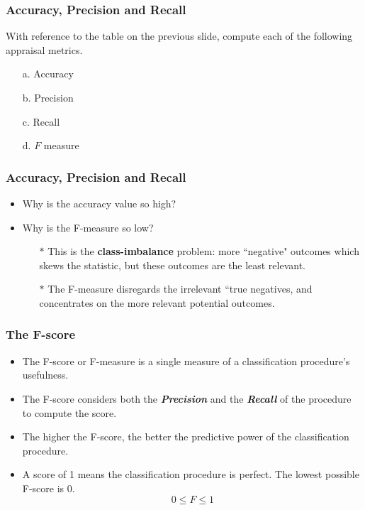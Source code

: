 \documentclass[a4]{beamer}
\begin{document}
\begin{frame}
	\frametitle{Accuracy, Precision and Recall}
	
	With reference to the table on the previous slide, compute each of the following appraisal metrics.
	\begin{multicols}{2} 
		\begin{itemize}
			\item[a.] Accuracy
			\item[b.] Precision
			\item[c.] Recall
			\item[d.] $F$ measure
		\end{itemize}
	\end{multicols}
\end{frame}
\begin{frame}
	\frametitle{Accuracy, Precision and Recall}
	\begin{itemize}
		\item Why is the accuracy value so high?
		\item Why is the F-measure so low?
		\begin{itemize}
\item[$\ast$] This is the \textbf{class-imbalance} problem: more ``negative" outcomes which skews the statistic, but these outcomes are the least relevant.
\item[$\ast$] The F-measure disregards the irrelevant ``true negatives, and concentrates on the more relevant potential outcomes.

		\end{itemize}
		\end{itemize}
\end{frame}
\begin{frame}
	\frametitle{The F-score}
	\Large
	\begin{itemize}
		\item The F-score or F-measure is a single measure of a classification procedure's usefulness. 
		\item The F-score considers both the \textit{\textbf{Precision}} and the \textit{\textbf{Recall}} of the procedure to compute the score.
		\item The higher the F-score, the better the predictive power of the 
		classification procedure. 
		\item A score of 1 means the classification procedure is perfect. The lowest possible F-score is 0.
		\[ 0 \leq F \leq 1 \]
	\end{itemize}
\end{frame}
\end{document}
